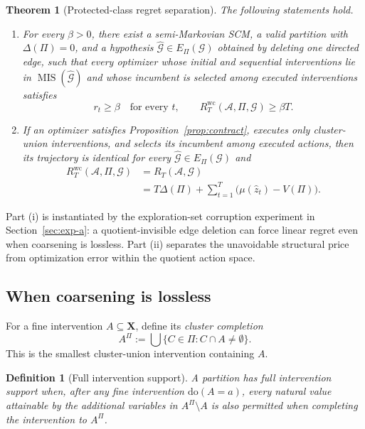 \documentclass[twoside]{article}
\newtheorem{theorem}{Theorem}
\newtheorem{definition}{Definition}
\newcommand{\doo}{\mathrm{do}}
\newcommand{\Gg}{\mathcal{G}}
\begin{document}
\begin{theorem}[Protected-class regret separation]
\label{thm:separation}
The following statements hold.
\begin{enumerate}[label=(\roman*),leftmargin=1.6em,itemsep=2pt,topsep=2pt]
 \item For every \(\beta>0\), there exist a semi-Markovian SCM, a valid
 partition with \(\Delta(\Pi)=0\), and a hypothesis
 \(\widehat{\Gg}\in E_\Pi(\Gg)\) obtained by deleting one directed edge, such
 that every optimizer whose initial and sequential interventions lie in
 \(\operatorname{MIS}(\widehat{\Gg})\) and whose incumbent is selected among
 executed interventions satisfies
 \[
  r_t\ge\beta\quad\text{for every }t,
  \qquad
  R_T^{\mathrm{wc}}(\mathcal A,\Pi,\Gg)\ge\beta T.
 \]
\item If an optimizer satisfies Proposition~\ref{prop:contract}, executes only cluster-union interventions, and selects its incumbent among executed actions, then its trajectory is identical for every \(\widehat{\Gg}\in E_\Pi(\Gg)\) and
 \[
 \begin{aligned}
 R_T^{\mathrm{wc}}(\mathcal A,\Pi,\Gg)
 &=R_T(\mathcal A,\Gg)\\
 &=T\Delta(\Pi)
 +\sum_{t=1}^{T}\bigl(\mu(\hat z_t)-V(\Pi)\bigr).
 \end{aligned}
 \]
\end{enumerate}
\end{theorem}

Part (i) is instantiated by the exploration-set corruption experiment in Section~\ref{sec:exp-a}: a quotient-invisible edge deletion can force linear regret even when coarsening is lossless. Part (ii) separates the unavoidable structural price from optimization error within the quotient action space.

\subsection{When coarsening is lossless}
\label{sec:zero-price}

For a fine intervention \(A\subseteq\mathbf X\), define its \emph{cluster completion}
\[
 A^\Pi:=\bigcup\{C\in\Pi:C\cap A\ne\emptyset\}.
\]
This is the smallest cluster-union intervention containing \(A\).

\begin{definition}[Full intervention support]
\label{def:full-support}
A partition has full intervention support when, after any fine intervention \(\doo(A=a)\), every natural value attainable by the additional variables in \(A^\Pi\setminus A\) is also permitted when completing the intervention to \(A^\Pi\).
\end{definition}
\end{document}
